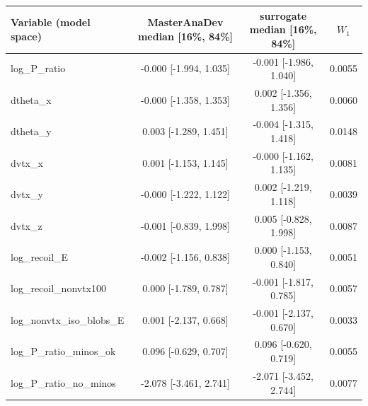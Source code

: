\begin{tabular}{lccc}
\toprule
Variable (model space) & MasterAnaDev median [16\%, 84\%] & surrogate median [16\%, 84\%] & $W_1$ \\
\midrule
log\_P\_ratio & -0.000 [-1.994, 1.035] & -0.001 [-1.986, 1.040] & 0.0055 \\
dtheta\_x & -0.000 [-1.358, 1.353] & 0.002 [-1.356, 1.356] & 0.0060 \\
dtheta\_y & 0.003 [-1.289, 1.451] & -0.004 [-1.315, 1.418] & 0.0148 \\
dvtx\_x & 0.001 [-1.153, 1.145] & -0.000 [-1.162, 1.135] & 0.0081 \\
dvtx\_y & -0.000 [-1.222, 1.122] & 0.002 [-1.219, 1.118] & 0.0039 \\
dvtx\_z & -0.001 [-0.839, 1.998] & 0.005 [-0.828, 1.998] & 0.0087 \\
log\_recoil\_E & -0.002 [-1.156, 0.838] & 0.000 [-1.153, 0.840] & 0.0051 \\
log\_recoil\_nonvtx100 & 0.000 [-1.789, 0.787] & -0.001 [-1.817, 0.785] & 0.0057 \\
log\_nonvtx\_iso\_blobs\_E & 0.001 [-2.137, 0.668] & -0.001 [-2.137, 0.670] & 0.0033 \\
log\_P\_ratio\_minos\_ok & 0.096 [-0.629, 0.707] & 0.096 [-0.620, 0.719] & 0.0055 \\
log\_P\_ratio\_no\_minos & -2.078 [-3.461, 2.741] & -2.071 [-3.452, 2.744] & 0.0077 \\
\bottomrule
\end{tabular}
